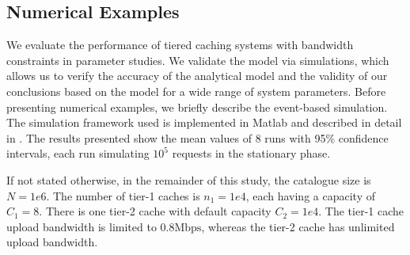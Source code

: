 \subsection{Numerical Examples}\label{sec:hierarchical:analyticbw:results}

We evaluate the performance of tiered caching systems with bandwidth constraints in parameter studies.
We validate the model via simulations, which allows us to verify the accuracy of the analytical model and the validity of our conclusions based on the model for a wide range of system parameters.
Before presenting numerical examples, we briefly describe the event-based simulation.
The simulation framework used is implemented in Matlab and described in detail in \cite{info3-inproceedings-2015-530}. The results presented show the mean values of 8 runs with 95\% confidence intervals, each run simulating $10^5$ requests in the stationary phase.

If not stated otherwise, in the remainder of this study, the catalogue size is $N=1e6$.
The number of tier-1 caches is $n_1=1e4$, each having a capacity of $C_1=8$.
There is one tier-2 cache with default capacity $C_2=1e4$.
The tier-1 cache upload bandwidth is limited to $0.8\text{Mbps}$, whereas the tier-2 cache has unlimited upload bandwidth.

